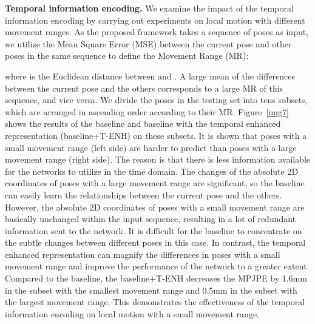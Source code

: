 \documentclass[sigconf]{acmart}
\begin{document}
\textbf{Temporal information encoding.} We examine the impact of the temporal information encoding by carrying out experiments on local motion with different movement ranges. As the proposed framework takes a sequence of poses as input, we utilize the Mean Square Error (MSE) between the current pose and other poses in the same sequence to define the Movement Range (MR):

where is the Euclidean distance between  and . A large mean of the differences between the current pose and the others corresponds to a large MR of this sequence, and vice versa. We divide the poses in the testing set into tens subsets, which are arranged in ascending order according to their MR. Figure~\ref{img7} shows the results of the baseline and baseline with the temporal enhanced representation (baseline+T-ENH) on these subsets. It is shown that poses with a small movement range (left side) are harder to predict than poses with a large movement range (right side). The reason is that there is less information available for the networks to utilize in the time domain. The changes of the absolute 2D coordinates of poses with a large movement range are significant, so the baseline can easily learn the relationships between the current pose and the others. However, the absolute 2D coordinates of poses with a small movement range are basically unchanged within the input sequence, resulting in a lot of redundant information sent to the network. It is difficult for the baseline to concentrate on the subtle changes between different poses in this case. In contrast, the temporal enhanced representation can magnify the differences in poses with a small movement range and improve the performance of the network to a greater extent. Compared to the baseline, the baseline+T-ENH decreases the MPJPE by 1.6mm in the subset with the smallest movement range and 0.5mm in the subset with the largest movement range. This demonstrates the effectiveness of the temporal information encoding on local motion with a small movement range.
\end{document}
